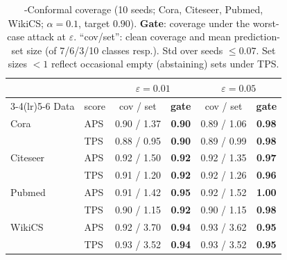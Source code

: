 \begin{table}[t]\centering\footnotesize\setlength{\tabcolsep}{4pt}
\caption{\AEGIS-Conformal coverage (10 seeds; Cora, Citeseer, Pubmed, WikiCS; $\alpha{=}0.1$, target $0.90$). \textbf{Gate}: coverage under the worst-case attack at $\varepsilon$. ``cov/set'': clean coverage and mean prediction-set size (of 7/6/3/10 classes resp.). Std over seeds ${\leq}0.07$. Set sizes ${<}1$ reflect occasional empty (abstaining) sets under TPS.}
\label{tab:conformal}
\begin{tabular}{ll cc cc}
\toprule
 & & \multicolumn{2}{c}{$\varepsilon{=}0.01$} & \multicolumn{2}{c}{$\varepsilon{=}0.05$} \\
\cmidrule(lr){3-4}\cmidrule(lr){5-6}
Data & score & cov / set & \textbf{gate} & cov / set & \textbf{gate} \\
\midrule
Cora     & APS & 0.90 / 1.37 & \textbf{0.90} & 0.89 / 1.06 & \textbf{0.98} \\
         & TPS & 0.88 / 0.95 & \textbf{0.90} & 0.89 / 0.99 & \textbf{0.98} \\
\midrule
Citeseer & APS & 0.92 / 1.50 & \textbf{0.92} & 0.92 / 1.35 & \textbf{0.97} \\
         & TPS & 0.91 / 1.20 & \textbf{0.92} & 0.92 / 1.26 & \textbf{0.96} \\
\midrule
Pubmed   & APS & 0.91 / 1.42 & \textbf{0.95} & 0.92 / 1.52 & \textbf{1.00} \\
         & TPS & 0.90 / 1.15 & \textbf{0.92} & 0.90 / 1.15 & \textbf{0.98} \\
\midrule
WikiCS   & APS & 0.92 / 3.70 & \textbf{0.94} & 0.93 / 3.62 & \textbf{0.95} \\
         & TPS & 0.93 / 3.52 & \textbf{0.94} & 0.93 / 3.52 & \textbf{0.95} \\
\bottomrule
\end{tabular}
\end{table}

